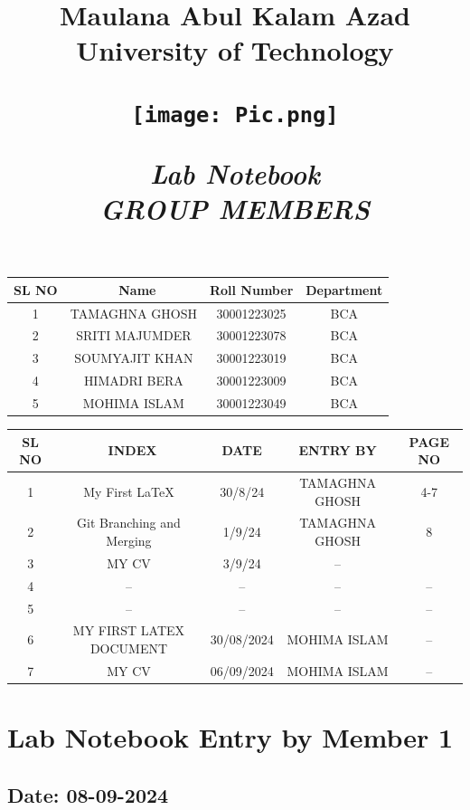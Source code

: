 \documentclass[12pt]{article}
\title{
    \vspace{0.2in}
    \Huge \textbf{Maulana Abul Kalam Azad University of Technology} \\
    \vspace{0.5in} %
    \begin{center}
        \texttt{[image: Pic.png]} %
    \end{center}
    \vspace{0.5in}
    \Huge\textbf{\textit{Lab Notebook}} \\
    \vspace{0.5in}
    \newpage
    \Large \textbf{\textit{GROUP MEMBERS}} \\
    \vspace{0.5in}
}
\date{}
\begin{document}
\maketitle

\begin{center}
    \begin{tabular}{|c| c | c | c |}
    \hline
    \textbf{SL NO}&\
    \textbf{Name} & \textbf{Roll Number} & \textbf{Department} \\
    \hline
     1 & TAMAGHNA GHOSH &30001223025 & BCA  \\
    \hline
     2& SRITI MAJUMDER & 30001223078 & BCA \\
    \hline
     3& SOUMYAJIT KHAN & 30001223019 & BCA   \\
    \hline
     4 & HIMADRI BERA & 30001223009 & BCA \\
    \hline
     5 & MOHIMA ISLAM & 30001223049 & BCA \\
    \hline
    \end{tabular}
\end{center}
\newpage
\begin{center}
    \begin{tabular}{|c|  c | c|c|c| }
    \hline
    \textbf{SL NO}&\
    \textbf{INDEX} & \textbf{DATE}&\textbf{ENTRY BY} &\textbf{PAGE NO} \\
    \hline
     1 & My First \LaTeX & 30/8/24&TAMAGHNA GHOSH & 4-7\\
    \hline
     2&Git Branching and Merging&1/9/24& TAMAGHNA GHOSH &8 \\
    \hline
     3&  MY CV & 3/9/24 & --&\\
    \hline
    4&   -- &-- &--&--\\
    5&--&--&--&--\\
    \hline
    6&MY FIRST LATEX DOCUMENT&30/08/2024&MOHIMA ISLAM&--\\
    \hline
    7&MY CV&06/09/2024&MOHIMA ISLAM&--\\
     \end{tabular}
\end{center}

\newpage

\section{Lab Notebook Entry by Member 1}
\subsection*{Date: 08-09-2024}
\end{document}
